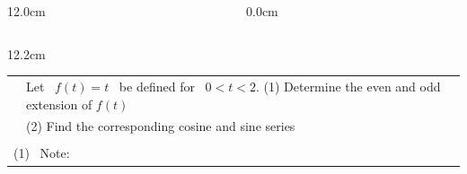 \begin{frame}
\begin{columns}
\begin{column}{12.0cm}
\vspace{4.2cm}

\end{column}\begin{column}{0.0cm}\end{column}\end{columns}
\end{frame}

\begin{frame}
\scriptsize
\begin{columns}\begin{column}{12.2cm}

{\setlength{\extrarowheight}{-0.1cm}
\begin{tabular}{p{0.15cm}p{10.6cm}}
	\EX & Let \, $f(t) = t$ \, be defined for \, $0 < t < 2$. (1) Determine the even and odd extension of $f(t)$\\
	& \hspace{4.63cm} (2) Find the corresponding cosine and sine series \\
	&\\
	\multicolumn{2}{l}{(1) \, Note: 
	\ON<2->{\B{$L = 2$ and $f(-t) = -t$}}} \\
\end{tabular}}


\end{column}
\end{columns}
\end{frame}

